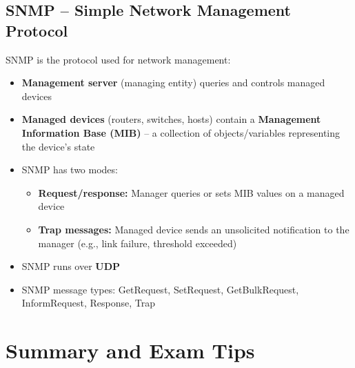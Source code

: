 \subsection{SNMP -- Simple Network Management Protocol}

\begin{keybox}[SNMP]
SNMP is the protocol used for network management:
\begin{itemize}[noitemsep]
    \item \textbf{Management server} (managing entity) queries and controls managed devices
    \item \textbf{Managed devices} (routers, switches, hosts) contain a \textbf{Management Information Base (MIB)} -- a collection of objects/variables representing the device's state
    \item SNMP has two modes:
    \begin{itemize}[noitemsep]
        \item \textbf{Request/response:} Manager queries or sets MIB values on a managed device
        \item \textbf{Trap messages:} Managed device sends an unsolicited notification to the manager (e.g., link failure, threshold exceeded)
    \end{itemize}
    \item SNMP runs over \textbf{UDP}
    \item SNMP message types: GetRequest, SetRequest, GetBulkRequest, InformRequest, Response, Trap
\end{itemize}
\end{keybox}

\section{Summary and Exam Tips}

